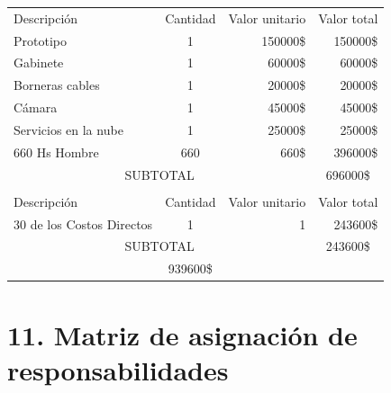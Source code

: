 \documentclass[11pt]{charter}
\begin{document}
\begin{table}[htpb]
\centering
\begin{tabularx}{\linewidth}{@{}|X|c|r|r|@{}}
\hline
\rowcolor[HTML]{C0C0C0} 
\multicolumn{4}{|c|}{\cellcolor[HTML]{C0C0C0}COSTOS DIRECTOS} \\ \hline
\rowcolor[HTML]{C0C0C0} 
Descripción &
  \multicolumn{1}{c|}{\cellcolor[HTML]{C0C0C0}Cantidad} &
  \multicolumn{1}{c|}{\cellcolor[HTML]{C0C0C0}Valor unitario} &
  \multicolumn{1}{c|}{\cellcolor[HTML]{C0C0C0}Valor total} \\ \hline

  
\multicolumn{1}{|l|}{Prototipo}				&1	&150000\$	&150000\$	\\ \hline
\multicolumn{1}{|l|}{Gabinete}				&1	&60000\$	&60000\$	\\ \hline
\multicolumn{1}{|l|}{Borneras cables}		&1	&20000\$	&20000\$	\\ \hline
\multicolumn{1}{|l|}{Cámara}				&1	&45000\$	&45000\$	\\ \hline
\multicolumn{1}{|l|}{Servicios en la nube}	&1	&25000\$	&25000\$	\\ \hline
\multicolumn{1}{|l|}{660 Hs Hombre}    		&660	&660\$	&396000\$	\\ \hline
\multicolumn{3}{|c|}{SUBTOTAL} &
\multicolumn{1}{c|}{696000\$} \\ \hline

\rowcolor[HTML]{C0C0C0} 
\multicolumn{4}{|c|}{\cellcolor[HTML]{C0C0C0}COSTOS INDIRECTOS} \\ \hline
\rowcolor[HTML]{C0C0C0} 
Descripción &  
  \multicolumn{1}{c|}{\cellcolor[HTML]{C0C0C0}Cantidad} &
  \multicolumn{1}{c|}{\cellcolor[HTML]{C0C0C0}Valor unitario} &
  \multicolumn{1}{c|}{\cellcolor[HTML]{C0C0C0}Valor total} \\ \hline
\multicolumn{1}{|l|}{30 de los Costos Directos } &1   &1   &243600\$
   \\ \hline

\multicolumn{3}{|c|}{SUBTOTAL} &
  \multicolumn{1}{c|}{243600\$} \\ \hline
\rowcolor[HTML]{C0C0C0}
\multicolumn{3}{|c|}{TOTAL} & 939600\$
   \\ \hline
\end{tabularx}%
\end{table}
\newpage

\section{11. Matriz de asignación de responsabilidades}
\label{sec:responsabilidades}
\end{document}
